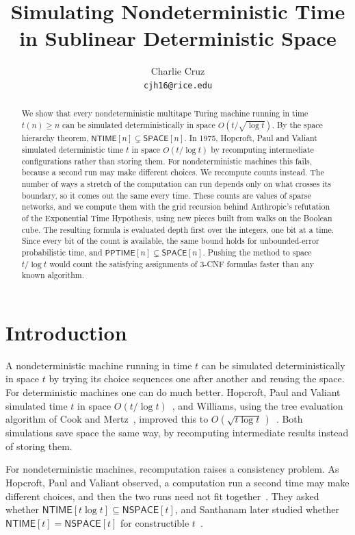 \documentclass[11pt]{article}
\title{Simulating Nondeterministic Time\\ in Sublinear Deterministic Space}
\author{Charlie Cruz\\[2pt]\normalsize\texttt{cjh16@rice.edu}}
\date{\vspace{-2em}}
\theoremstyle{definition}
\theoremstyle{definition}
\theoremstyle{remark}
\newcommand{\NTIME}{\mathsf{NTIME}}
\newcommand{\SPACE}{\mathsf{SPACE}}
\newcommand{\NSPACE}{\mathsf{NSPACE}}
\newcommand{\PPTIME}{\mathsf{PPTIME}}
\begin{document}
\maketitle

\begin{abstract}
We show that every nondeterministic multitape Turing machine running in time $t(n)\ge n$ can be simulated deterministically in space $O(t/\sqrt{\log t})$. By the space hierarchy theorem, $\NTIME[n]\subsetneq\SPACE[n]$.
In 1975, Hopcroft, Paul and Valiant simulated deterministic time $t$ in space $O(t/\log t)$ by recomputing intermediate configurations rather than storing them. For nondeterministic machines this fails, because a second run may make different choices. We recompute counts instead. The number of ways a stretch of the computation can run depends only on what crosses its boundary, so it comes out the same every time. These counts are values of sparse networks, and we compute them with the grid recursion behind Anthropic's refutation of the Exponential Time Hypothesis, using new pieces built from walks on the Boolean cube. The resulting formula is evaluated depth first over the integers, one bit at a time. Since every bit of the count is available, the same bound holds for unbounded-error probabilistic time, and $\PPTIME[n]\subsetneq\SPACE[n]$. Pushing the method to space $t/\log t$ would count the satisfying assignments of $3$-CNF formulas faster than any known algorithm.
\end{abstract}

\section{Introduction}

A nondeterministic machine running in time $t$ can be simulated deterministically in space $t$ by trying its choice sequences one after another and reusing the space. For deterministic machines one can do much better. Hopcroft, Paul and Valiant simulated time $t$ in space $O(t/\log t)$~\cite{HPV77}, and Williams, using the tree evaluation algorithm of Cook and Mertz~\cite{CM24}, improved this to $O(\sqrt{t\log t}\,)$~\cite{Wil25}. Both simulations save space the same way, by recomputing intermediate results instead of storing them.

For nondeterministic machines, recomputation raises a consistency problem. As Hopcroft, Paul and Valiant observed, a computation run a second time may make different choices, and then the two runs need not fit together~\cite[\S2]{HPV75}. They asked whether $\NTIME[t\log t]\subseteq\NSPACE[t]$, and Santhanam later studied whether $\NTIME[t]=\NSPACE[t]$ for constructible $t$~\cite{San01}.
\end{document}
